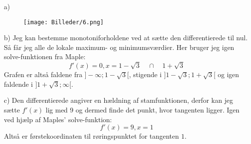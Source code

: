 a)
\begin{figure}[H]
    \centering
    \texttt{[image: Billeder/6.png]}
\end{figure}

b)
Jeg kan bestemme monotoniforholdene ved at sætte den differentierede til nul. Så får jeg alle de lokale maximum- og minimumsværdier. Her bruger jeg igen solve-funktionen fra Maple:
$$f'(x)=0, x=1-\sqrt{3} \quad\cap\quad 1 + \sqrt{3}$$
Grafen er altså faldene fra $]-\infty;1-\sqrt{3}[$, stigende i $]1-\sqrt{3};1 + \sqrt{3}[$ og igen faldende i $]1 + \sqrt{3};\infty[$.\newline

c)
Den differentierede angiver en hældning af stamfunktionen, derfor kan jeg sætte $f'(x)$ lig med 9 og dermed finde det punkt, hvor tangenten ligger.
Igen ved hjælp af Maples' solve-funktion:
$$f'(x)=9, x=1$$
Altså er førstekoordinaten til røringspunktet for tangenten $1$.\newpage